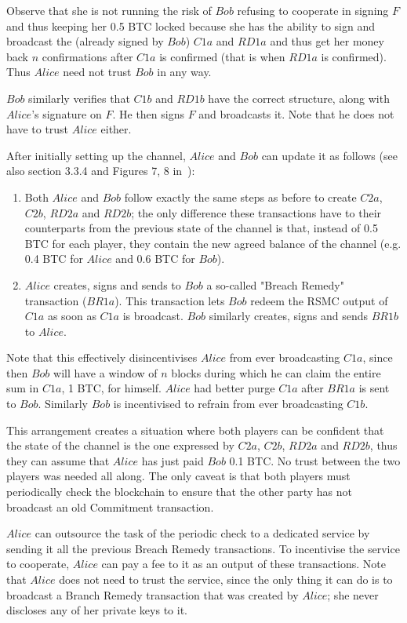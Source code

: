 \begin{enumerate}
    Observe that she is not running the risk of $Bob$ refusing to cooperate in signing $F$
    and thus keeping her 0.5 BTC locked because she has the ability to sign and broadcast
    the (already signed by $Bob$) $C1a$ and $RD1a$ and thus get her money back $n$
    confirmations after $C1a$ is confirmed (that is when $RD1a$ is confirmed). Thus
    $Alice$ need not trust $Bob$ in any way.

    $Bob$ similarly verifies that $C1b$ and $RD1b$ have the correct structure, along with
    $Alice$'s signature on $F$. He then signs $F$ and broadcasts it. Note that he does not
    have to trust $Alice$ either.
  \end{enumerate}

  After initially setting up the channel, $Alice$ and $Bob$ can update it as follows (see
  also section 3.3.4 and Figures 7, 8 in~\cite{lightning}):
  \begin{enumerate}
    \item Both $Alice$ and $Bob$ follow exactly the same steps as before to create $C2a$,
    $C2b$, $RD2a$ and $RD2b$; the only difference these transactions have to their
    counterparts from the previous state of the channel is that, instead of 0.5 BTC for
    each player, they contain the new agreed balance of the channel (e.g. 0.4 BTC for
    $Alice$ and 0.6 BTC for $Bob$).

    \item $Alice$ creates, signs and sends to $Bob$ a so-called "Breach Remedy"
    transaction ($BR1a$). This transaction lets $Bob$ redeem the RSMC output of $C1a$ as
    soon as $C1a$ is broadcast. $Bob$ similarly creates, signs and sends $BR1b$ to
    $Alice$.
  \end{enumerate}
  Note that this effectively disincentivises $Alice$ from ever broadcasting $C1a$,
  since then $Bob$ will have a window of $n$ blocks during which he can claim the entire
  sum in $C1a$, 1 BTC, for himself. $Alice$ had better purge $C1a$ after $BR1a$ is sent to
  $Bob$. Similarly $Bob$ is incentivised to refrain from ever broadcasting $C1b$.

  This arrangement creates a situation where both players can be confident that the state
  of the channel is the one expressed by $C2a$, $C2b$, $RD2a$ and $RD2b$, thus they can
  assume that $Alice$ has just paid $Bob$ 0.1 BTC. No trust between the two players was
  needed all along. The only caveat is that both players must periodically check the
  blockchain to ensure that the other party has not broadcast an old Commitment
  transaction.

  $Alice$ can outsource the task of the periodic check to a dedicated service by sending
  it all the previous Breach Remedy transactions. To incentivise the service to cooperate,
  $Alice$ can pay a fee to it as an output of these transactions. Note that $Alice$ does
  not need to trust the service, since the only thing it can do is to broadcast a Branch
  Remedy transaction that was created by $Alice$; she never discloses any of her private
  keys to it.
